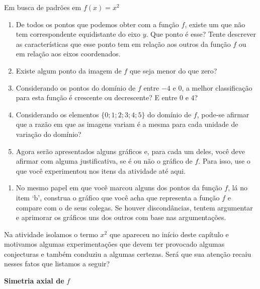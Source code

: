 \begin{task}{Em busca de padrões em \(f(x)=x^2\)}
\begin{enumerate}
\item {} 
De todos os pontos que podemos obter com a função \(f\), existe um que não tem correspondente equidistante do eixo \(y\). Que ponto é esse? Tente descrever as características que esse ponto tem em relação aos outros da função \(f\) ou em relação aos eixos coordenados.

\item {} 
Existe algum ponto da imagem de \(f\) que seja menor do que zero?

\item {} 
Considerando os pontos do domínio de \(f\) entre \(-4\) e \(0\), a melhor classificação para esta função é crescente ou decrescente? E entre \(0\) e \(4\)?

\item {} 
Considerando os elementos \(\{ 0; 1; 2; 3; 4; 5 \}\) do domínio de \(f\), pode-se afirmar que a razão em que as imagens variam é a mesma para cada unidade de variação do domínio?

\item {} 
Agora serão apresentados alguns gráficos e, para cada um deles, você deve afirmar com alguma justificativa, se é ou não o gráfico de \(f\). Para isso, use o que você experimentou nos itens da atividade até aqui.

\end{enumerate}


\begin{enumerate}
\item {} 
No mesmo papel em que você marcou alguns dos pontos da função \(f\), lá no item ‘b’, construa o gráfico que você acha que representa a função \(f\) e compare com o de seus colegas. Se houver discondâncias, tentem argumentar e aprimorar os gráficos uns dos outros com base nas argumentações.

\end{enumerate}
\end{task}

\label{\detokenize{AF209-2:organizando-as-ideias-caracteristicas-da-funcao-real}}\label{\detokenize{AF209-2:sec-funcao-quadratica-org-ideias-em-x-a-2}}
Na atividade isolamos o termo \(x^{2}\) que apareceu no início deste capítulo e motivamos algumas experimentações que devem ter provocado algumas conjecturas e também conduziu a algumas certezas. Será que sua atenção recaiu nesses fatos que listamos a seguir?

\textbf{Simetria axial de} \(f\)

